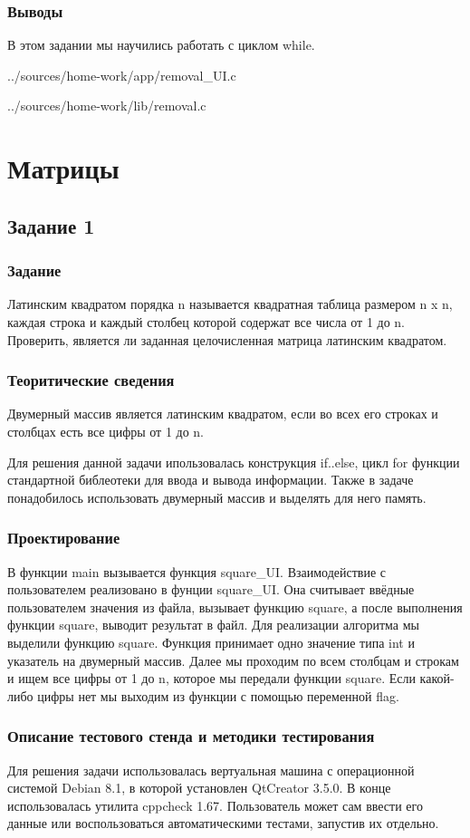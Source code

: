 \documentclass[12pt,a4paper]{report}
\begin{document}
\subsection{Выводы}
В этом задании мы научились работать с циклом while.

{../sources/home-work/app/removal_UI.c}


{../sources/home-work/lib/removal.c}
\chapter{Матрицы}
\section{Задание 1}
\subsection{Задание}
Латинским квадратом порядка n называется квадратная таблица размером n x n, каждая строка и каждый столбец которой содержат все числа от 1 до n. Проверить, является ли заданная целочисленная матрица латинским квадратом.
\subsection{Теоритические сведения}
Двумерный массив является латинским квадратом, если во всех его строках и столбцах есть все цифры от 1 до n.

Для решения данной задачи ипользовалась конструкция if..else, цикл for функции стандартной библеотеки для ввода и вывода информации. Также в задаче понадобилось использовать двумерный массив и выделять для него память.
\subsection{Проектирование}
В функции main вызывается функция square\_UI. Взаимодействие с пользователем реализовано в фунции square\_UI. Она считывает ввёдные пользователем значения из файла, вызывает функцию square, а после выполнения функции square, выводит результат в файл. Для реализации алгоритма мы выделили функцию square. Функция принимает одно значение типа int и указатель на двумерный массив. Далее мы проходим по всем столбцам и строкам и ищем все цифры от 1 до n, которое мы передали функции square. Если какой-либо цифры нет мы выходим из функции с помощью переменной flag. 
\subsection{Описание тестового стенда и методики тестирования}
Для решения задачи использовалась вертуальная машина с операционной системой Debian 8.1, в которой установлен QtCreator 3.5.0. В конце использовалась утилита cppcheck 1.67.
Пользователь может сам ввести его данные или воспользоваться автоматическими тестами, запустив их отдельно.
\end{document}
